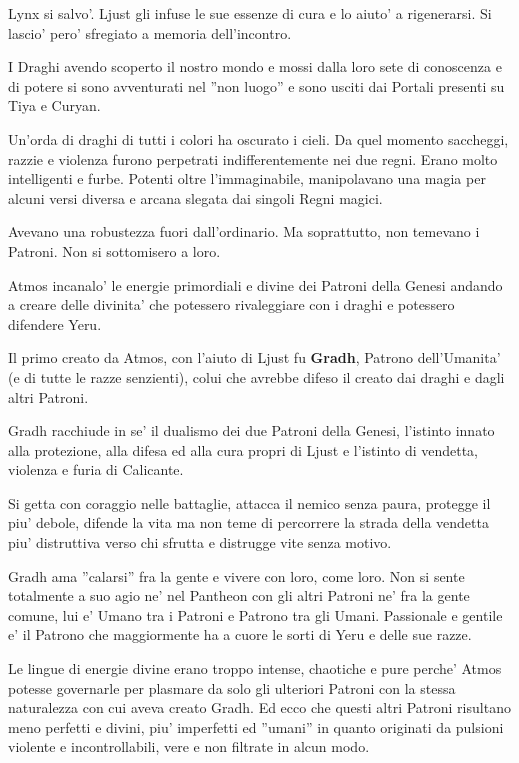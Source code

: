 \documentclass[a4paper,11pt,twoside,openany]{book}
\begin{document}
{Lynx si salvo'. Ljust gli infuse le sue essenze di cura e lo aiuto' a rigenerarsi. Si lascio' pero' sfregiato a memoria dell'incontro.

I Draghi avendo scoperto il nostro mondo e mossi dalla loro sete di conoscenza e di potere si sono avventurati nel ''non luogo'' e sono usciti dai Portali presenti su Tiya e Curyan.

Un'orda di draghi di tutti i colori ha oscurato i cieli. Da quel momento saccheggi, razzie e violenza furono perpetrati indifferentemente nei due regni. Erano molto intelligenti e furbe. Potenti oltre l'immaginabile, manipolavano una magia per alcuni versi diversa e arcana slegata dai singoli Regni magici.

Avevano una robustezza fuori dall'ordinario. Ma soprattutto, non temevano i Patroni. Non si sottomisero a loro.

Atmos incanalo' le energie primordiali e divine dei Patroni della Genesi andando a creare delle divinita' che potessero rivaleggiare con i draghi e potessero difendere Yeru.

Il primo creato da Atmos, con l'aiuto di Ljust fu \textbf{Gradh}, Patrono dell'Umanita' (e di tutte le razze senzienti), colui che avrebbe difeso il creato dai draghi e dagli altri Patroni.

Gradh racchiude in se' il dualismo dei due Patroni della Genesi, l'istinto innato alla protezione, alla difesa ed alla cura propri di Ljust e l'istinto di vendetta, violenza e furia di Calicante.

Si getta con coraggio nelle battaglie, attacca il nemico senza paura, protegge il piu' debole, difende la vita ma non teme di percorrere la strada della vendetta piu' distruttiva verso chi sfrutta e distrugge vite senza motivo.

Gradh ama ''calarsi'' fra la gente e vivere con loro, come loro. 
Non si sente totalmente a suo agio ne' nel Pantheon con gli altri Patroni ne' fra la gente comune, lui e' Umano tra i Patroni e Patrono tra gli Umani. Passionale e gentile e' il Patrono che maggiormente ha a cuore le sorti di Yeru e delle sue razze.

Le lingue di energie divine erano troppo intense, chaotiche e pure perche' Atmos potesse governarle per plasmare da solo gli ulteriori Patroni con la stessa naturalezza con cui aveva creato Gradh. Ed ecco che questi altri Patroni risultano meno perfetti e divini, piu' imperfetti ed ''umani'' in quanto originati da pulsioni violente e incontrollabili, vere e non filtrate in alcun modo.

}
\end{document}
